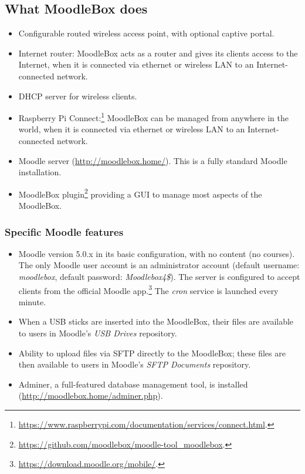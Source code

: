 \documentclass[12pt]{article}
\begin{document}
\subsection{What MoodleBox does}

\begin{itemize}
\item Configurable routed wireless access point, with optional captive portal.
\item Internet router: MoodleBox acts as a router and gives its clients access to the Internet, when it is connected via ethernet or wireless LAN to an Internet-connected network.
\item DHCP server for wireless clients.
\item Raspberry Pi Connect:\footnote{\url{https://www.raspberrypi.com/documentation/services/connect.html}.} MoodleBox can be managed from anywhere in the world, when it is connected via ethernet or wireless LAN to an Internet-connected network.
\item Moodle server (\url{http://moodlebox.home/}).
This is a fully standard Moodle installation.
\item MoodleBox plugin\footnote{\url{https://github.com/moodlebox/moodle-tool_moodlebox}.} providing a GUI to manage most aspects of the MoodleBox.
\end{itemize}

\subsubsection{Specific Moodle features}
\begin{itemize}
\item Moodle version 5.0.x in its basic configuration, with no content (no courses).
The only Moodle user account is an administrator account (default username: \emph{moodlebox}, default password: \emph{Moodlebox4\$}).
The server is configured to accept clients from the official Moodle app.\footnote{\url{https://download.moodle.org/mobile/}.}
The \textsl{cron} service is launched every minute.
\item When a USB sticks are inserted into the MoodleBox, their files are available to users in Moodle's \textsl{USB Drives} repository.
\item Ability to upload files via SFTP directly to the MoodleBox; these files are then available to users in Moodle's \textsl{SFTP Documents} repository.
\item Adminer, a full-featured database management tool, is installed (\url{http://moodlebox.home/adminer.php}).
\end{itemize}
\end{document}
